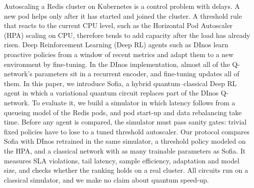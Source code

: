Autoscaling a Redis cluster on Kubernetes is a control problem with delays. A new pod helps only after it has
started and joined the cluster. A threshold rule that reacts to the current CPU level, such as the Horizontal
Pod Autoscaler (HPA) scaling on CPU, therefore tends to add capacity after the load has already risen. Deep
Reinforcement Learning (Deep RL) agents such as DInos learn proactive policies from a window of recent metrics
and adapt them to a new environment by fine-tuning. In the DInos implementation, almost all of the Q-network's
parameters sit in a recurrent encoder, and fine-tuning updates all of them.
In this paper, we introduce Sofia, a hybrid quantum--classical Deep RL agent in which a variational quantum
circuit replaces part of the DInos Q-network.
To evaluate it, we build a simulator in which latency follows from a queueing model of the Redis pods, and pod
start-up and data rebalancing take time. Before any agent is compared, the simulator must pass sanity gates:
trivial fixed policies have to lose to a tuned threshold autoscaler.
Our protocol compares Sofia with DInos retrained in the same simulator, a threshold policy modeled on the HPA,
and a classical network with as many trainable parameters as Sofia. It measures SLA violations, tail latency,
sample efficiency, adaptation and model size, and checks whether the ranking holds on a real
cluster.
All circuits run on a classical simulator, and we make no claim about quantum speed-up.
